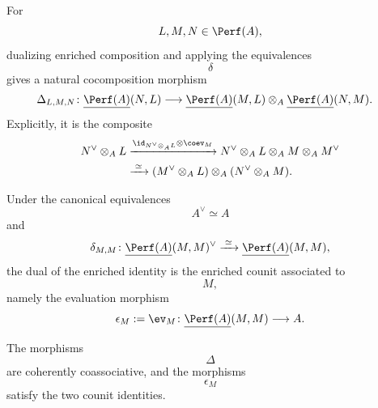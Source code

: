 \begin{proposition}
\label{prop:dual-cocomposition}
For
\[
    L,M,N\in\Perf(A),
\]
dualizing enriched composition and applying the equivalences
\[
    \delta
\]
gives a natural cocomposition morphism
\[
\begin{aligned}
    \Delta_{L,M,N}
    \colon
    \underline{\Perf(A)}(N,L)
    \longrightarrow{}&
    \underline{\Perf(A)}(M,L)
    \otimes_A
    \underline{\Perf(A)}(N,M).
\end{aligned}
\]
Explicitly, it is the composite
\[
\begin{aligned}
    N^\vee\otimes_A L
    &\xrightarrow{
        \id_{N^\vee\otimes_A L}
        \otimes
        \coev_M
    }
    N^\vee
    \otimes_A
    L
    \otimes_A
    M
    \otimes_A
    M^\vee
    \\
    &\xrightarrow{\;\simeq\;}
    (M^\vee\otimes_A L)
    \otimes_A
    (N^\vee\otimes_A M).
\end{aligned}
\]

Under the canonical equivalences
\[
    A^\vee
    \simeq
    A
\]
and
\[
    \delta_{M,M}
    \colon
    \underline{\Perf(A)}(M,M)^\vee
    \xrightarrow{\;\simeq\;}
    \underline{\Perf(A)}(M,M),
\]
the dual of the enriched identity is the enriched counit associated to
\[
    M,
\]
namely the evaluation morphism
\[
    \epsilon_M
    :=
    \ev_M
    \colon
    \underline{\Perf(A)}(M,M)
    \longrightarrow
    A.
\]

The morphisms
\[
    \Delta
\]
are coherently coassociative, and the morphisms
\[
    \epsilon_M
\]
satisfy the two counit identities.
\end{proposition}

